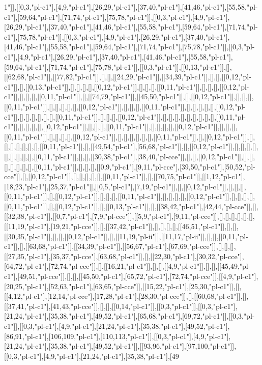 1"]],[[0,3,"pl-c1"],[4,9,"pl-c1"],[26,29,"pl-c1"],[37,40,"pl-c1"],[41,46,"pl-c1"],[55,58,"pl-c1"],[59,64,"pl-c1"],[71,74,"pl-c1"],[75,78,"pl-c1"]],[[0,3,"pl-c1"],[4,9,"pl-c1"],[26,29,"pl-c1"],[37,40,"pl-c1"],[41,46,"pl-c1"],[55,58,"pl-c1"],[59,64,"pl-c1"],[71,74,"pl-c1"],[75,78,"pl-c1"]],[[0,3,"pl-c1"],[4,9,"pl-c1"],[26,29,"pl-c1"],[37,40,"pl-c1"],[41,46,"pl-c1"],[55,58,"pl-c1"],[59,64,"pl-c1"],[71,74,"pl-c1"],[75,78,"pl-c1"]],[[0,3,"pl-c1"],[4,9,"pl-c1"],[26,29,"pl-c1"],[37,40,"pl-c1"],[41,46,"pl-c1"],[55,58,"pl-c1"],[59,64,"pl-c1"],[71,74,"pl-c1"],[75,78,"pl-c1"]],[[0,3,"pl-c1"]],[[0,13,"pl-c1"]],[],[[62,68,"pl-c1"]],[[77,82,"pl-c1"]],[],[],[[24,29,"pl-c1"]],[[34,39,"pl-c1"]],[],[],[[0,12,"pl-c1"]],[],[[0,13,"pl-c1"]],[],[],[],[],[[0,12,"pl-c1"]],[],[],[],[[0,11,"pl-c1"]],[],[],[],[[0,12,"pl-c1"]],[],[],[],[[0,11,"pl-c1"]],[],[[74,79,"pl-c1"]],[[45,50,"pl-c1"]],[],[[0,12,"pl-c1"]],[],[],[],[[0,11,"pl-c1"]],[],[],[],[],[],[[0,12,"pl-c1"]],[],[],[],[[0,11,"pl-c1"]],[],[],[],[],[],[[0,12,"pl-c1"]],[],[],[],[],[],[],[[0,11,"pl-c1"]],[],[],[],[[0,12,"pl-c1"]],[],[],[],[],[],[],[],[],[],[[0,11,"pl-c1"]],[],[],[],[],[[0,12,"pl-c1"]],[],[],[],[[0,11,"pl-c1"]],[],[],[],[],[[0,12,"pl-c1"]],[],[],[],[[0,11,"pl-c1"]],[],[],[],[],[[0,12,"pl-c1"]],[],[],[],[],[],[],[[0,11,"pl-c1"]],[],[[0,12,"pl-c1"]],[],[],[],[],[],[],[],[[0,11,"pl-c1"]],[],[[49,54,"pl-c1"],[56,68,"pl-c1"]],[],[[0,12,"pl-c1"]],[],[],[],[],[],[],[],[],[],[[0,11,"pl-c1"]],[],[],[[30,38,"pl-c1"],[38,40,"pl-cce"]],[],[],[[0,12,"pl-c1"]],[],[],[],[],[],[],[],[[0,11,"pl-c1"]],[],[],[],[[0,9,"pl-c1"],[9,11,"pl-cce"],[39,50,"pl-c1"],[50,52,"pl-cce"]],[],[[0,12,"pl-c1"]],[],[],[],[],[],[[0,11,"pl-c1"]],[],[[70,75,"pl-c1"]],[[1,12,"pl-c1"],[18,23,"pl-c1"],[25,37,"pl-c1"]],[[0,5,"pl-c1"],[7,19,"pl-c1"]],[],[[0,12,"pl-c1"]],[],[],[],[[0,11,"pl-c1"]],[],[[0,12,"pl-c1"]],[],[],[],[[0,11,"pl-c1"]],[],[],[],[],[[0,12,"pl-c1"]],[],[],[],[],[[0,11,"pl-c1"]],[],[[0,12,"pl-c1"]],[],[[0,13,"pl-c1"]],[],[[38,42,"pl-c1"],[42,44,"pl-cce"]],[],[[32,38,"pl-c1"]],[[0,7,"pl-c1"],[7,9,"pl-cce"]],[[5,9,"pl-c1"],[9,11,"pl-cce"]],[],[],[],[],[],[],[[11,19,"pl-c1"],[19,21,"pl-cce"]],[],[[37,42,"pl-c1"]],[],[],[],[],[[46,51,"pl-c1"]],[],[],[[30,35,"pl-c1"]],[],[],[[0,12,"pl-c1"]],[],[[11,19,"pl-ii"]],[[11,17,"pl-ii"]],[],[],[[0,11,"pl-c1"]],[],[[63,68,"pl-c1"]],[[34,39,"pl-c1"]],[[56,67,"pl-c1"],[67,69,"pl-cce"]],[],[],[],[[27,35,"pl-c1"],[35,37,"pl-cce"],[63,68,"pl-c1"]],[],[[22,30,"pl-c1"],[30,32,"pl-cce"],[64,72,"pl-c1"],[72,74,"pl-cce"]],[],[[16,21,"pl-c1"]],[],[],[[4,9,"pl-c1"]],[],[],[[45,49,"pl-c1"],[49,51,"pl-cce"]],[],[],[[45,50,"pl-c1"],[65,72,"pl-c1"],[72,74,"pl-cce"]],[[4,9,"pl-c1"],[20,25,"pl-c1"],[52,63,"pl-c1"],[63,65,"pl-cce"]],[[15,22,"pl-c1"],[25,30,"pl-c1"]],[],[[4,12,"pl-c1"],[12,14,"pl-cce"],[17,28,"pl-c1"],[28,30,"pl-cce"]],[],[[60,68,"pl-c1"]],[],[[37,41,"pl-c1"],[41,43,"pl-cce"]],[],[],[[0,14,"pl-c1"]],[[0,3,"pl-c1"]],[[0,3,"pl-c1"],[21,24,"pl-c1"],[35,38,"pl-c1"],[49,52,"pl-c1"],[65,68,"pl-c1"],[69,72,"pl-c1"]],[[0,3,"pl-c1"]],[[0,3,"pl-c1"],[4,9,"pl-c1"],[21,24,"pl-c1"],[35,38,"pl-c1"],[49,52,"pl-c1"],[86,91,"pl-c1"],[106,109,"pl-c1"],[110,113,"pl-c1"]],[[0,3,"pl-c1"],[4,9,"pl-c1"],[21,24,"pl-c1"],[35,38,"pl-c1"],[49,52,"pl-c1"]],[[93,96,"pl-c1"],[97,100,"pl-c1"]],[[0,3,"pl-c1"],[4,9,"pl-c1"],[21,24,"pl-c1"],[35,38,"pl-c1"],[49